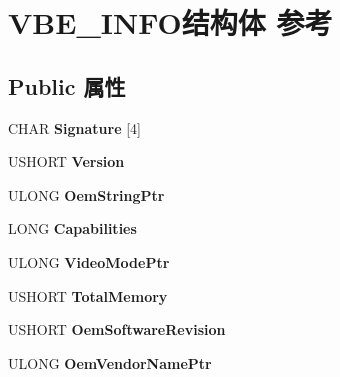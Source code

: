 \hypertarget{struct_v_b_e___i_n_f_o}{}\section{V\+B\+E\+\_\+\+I\+N\+F\+O结构体 参考}
\label{struct_v_b_e___i_n_f_o}
\subsection*{Public 属性}
\begin{DoxyCompactItemize}
\item 
\mbox{\label{struct_v_b_e___i_n_f_o_a170db14fb72f0f31b00540e970d7bfad}} 
C\+H\+AR {\bfseries Signature} \mbox{[}4\mbox{]}
\item 
\mbox{\label{struct_v_b_e___i_n_f_o_a3c24feee2b3dbde292209aea8bf01e9f}} 
U\+S\+H\+O\+RT {\bfseries Version}
\item 
\mbox{\label{struct_v_b_e___i_n_f_o_a00eb8c6e75bf8e7aa23e4788106ad8f7}} 
U\+L\+O\+NG {\bfseries Oem\+String\+Ptr}
\item 
\mbox{\label{struct_v_b_e___i_n_f_o_af52368c2209a359a30286b4b055be86a}} 
L\+O\+NG {\bfseries Capabilities}
\item 
\mbox{\label{struct_v_b_e___i_n_f_o_a9079bd109411ce3d6c0d8ac3b295a272}} 
U\+L\+O\+NG {\bfseries Video\+Mode\+Ptr}
\item 
\mbox{\label{struct_v_b_e___i_n_f_o_a7998cf69237b06ea434f99304c0dab3e}} 
U\+S\+H\+O\+RT {\bfseries Total\+Memory}
\item 
\mbox{\label{struct_v_b_e___i_n_f_o_a10eea5609c5eaece04e01c28a859ae86}} 
U\+S\+H\+O\+RT {\bfseries Oem\+Software\+Revision}
\item 
\mbox{\label{struct_v_b_e___i_n_f_o_a16c4b4326fabce951aa90e76943fd507}} 
U\+L\+O\+NG {\bfseries Oem\+Vendor\+Name\+Ptr}
\item 
\mbox{\label{struct_v_b_e___i_n_f_o_ac0c9612bbf0ce2d867e9e43e904d7fcf}} 

\end{DoxyCompactItemize}
